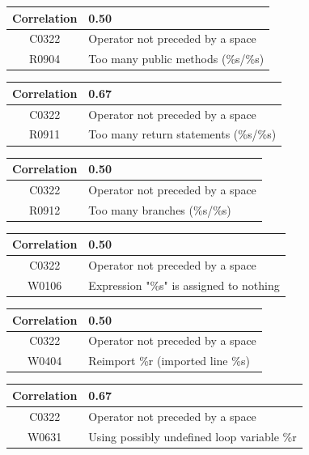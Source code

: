 \documentclass[12pt, a4paper]{article}
\newcommand{\tbf}[1]{\textbf{#1}}
\newcommand{\noi}{\noindent}
\begin{document}
\bigskip \noi
\begin{tabularx}{\textwidth}{|c|X|}
\hline
\tbf{Correlation}		& 0.50 \\
\hline
C0322		& Operator not preceded by a space \\
\hline
R0904		& Too many public methods (\%s/\%s) \\
\hline
\end{tabularx}

\bigskip \noi
\begin{tabularx}{\textwidth}{|c|X|}
\hline
\tbf{Correlation}		& 0.67 \\
\hline
C0322		& Operator not preceded by a space \\
\hline
R0911		& Too many return statements (\%s/\%s) \\
\hline
\end{tabularx}


\bigskip \noi
\begin{tabularx}{\textwidth}{|c|X|}
\hline
\tbf{Correlation}		& 0.50 \\
\hline
C0322		& Operator not preceded by a space \\
\hline
R0912		& Too many branches (\%s/\%s) \\
\hline
\end{tabularx}


\bigskip \noi
\begin{tabularx}{\textwidth}{|c|X|}
\hline
\tbf{Correlation}		& 0.50 \\
\hline
C0322		& Operator not preceded by a space \\
\hline
W0106		& Expression "\%s" is assigned to nothing \\
\hline
\end{tabularx}


\bigskip \noi
\begin{tabularx}{\textwidth}{|c|X|}
\hline
\tbf{Correlation}		& 0.50 \\
\hline
C0322		& Operator not preceded by a space \\
\hline
W0404		& Reimport \%r (imported line \%s) \\
\hline
\end{tabularx}


\bigskip \noi
\begin{tabularx}{\textwidth}{|c|X|}
\hline
\tbf{Correlation}		& 0.67 \\
\hline
C0322		& Operator not preceded by a space \\
\hline
W0631		& Using possibly undefined loop variable \%r \\
\hline
\end{tabularx}
\end{document}

